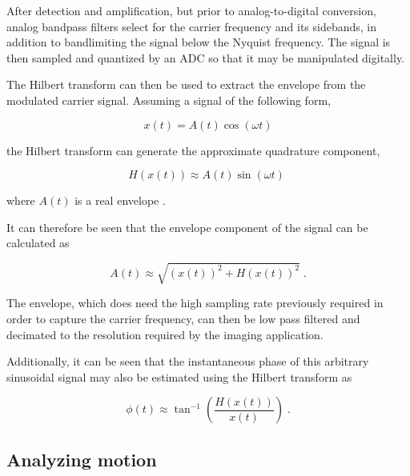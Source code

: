 After detection and amplification, but prior to analog-to-digital conversion, analog bandpass filters select for the carrier frequency and its sidebands, in addition to bandlimiting the signal below the Nyquist frequency. The signal is then sampled and quantized by an ADC so that it may be manipulated digitally.

The Hilbert transform can then be used to extract the envelope from the modulated carrier signal. Assuming a signal of the following form, 

\begin{equation}
x(t) = A(t)\cos{(\omega t)}
\end{equation}

\noindent the Hilbert transform can generate the approximate quadrature component,

\begin{equation}
H(x(t)) \approx A(t) \sin{(\omega t)} \;
\end{equation}

where $A(t)$ is a real envelope \cite{oppenheim}.

It can therefore be seen that the envelope component of the signal can be calculated as 

\begin{equation}
A(t) \approx \sqrt{(x(t))^2 + H(x(t))^2} \; .
\end{equation}

The envelope, which does need the high sampling rate previously required in order to capture the carrier frequency, can then be low pass filtered and decimated to the resolution required by the imaging application.

Additionally, it can be seen that the instantaneous phase of this arbitrary sinusoidal signal may also be estimated using the Hilbert transform as

\begin{equation}
\phi(t) \approx \tan^{-1} \left( \frac{H(x(t))}{x(t)} \right) \; .
\label{eq:hilbert_phase}
\end{equation}

\subsection{Analyzing motion}
\label{sec:sigproc_mo_anal}


